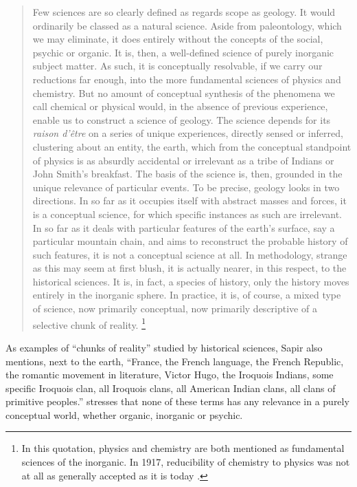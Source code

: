 \documentclass[output=paper]{langscibook}
\begin{document}
\begin{quotation}
    Few sciences are so clearly defined as regards scope as geology. It would ordinarily be classed as a natural science. Aside from paleontology, which we may eliminate, it does entirely without the concepts of the social, psychic or organic. It is, then, a well-defined science of purely inorganic subject matter. As such, it is conceptually resolvable, if we carry our reductions far enough, into the more fundamental sciences of physics and chemistry. But no amount of conceptual synthesis of the phenomena we call chemical or physical would, in the absence of previous experience, enable us to construct a science of geology. The science depends for its \emph{raison d'être} on a series of unique experiences, directly sensed or inferred, clustering about an entity, the earth, which from the conceptual standpoint of physics is as absurdly accidental or irrelevant as a tribe of Indians or John Smith's breakfast. The basis of the science is, then, grounded in the unique relevance of particular events. To be precise, geology looks in two directions. In so far as it occupies itself with abstract masses and forces, it is a conceptual science, for which specific instances as such are irrelevant. In so far as it deals with particular features of the earth's surface, say a particular mountain chain, and aims to reconstruct the probable history of such features, it is not a conceptual science at all. In methodology, strange as this may seem at first blush, it is actually nearer, in this respect, to the historical sciences. It is, in fact, a species of history, only the history moves entirely in the inorganic sphere. In practice, it is, of course, a mixed type of science, now primarily conceptual, now primarily descriptive of a selective chunk of reality.\label{q:elffers:sapirquote}
    \citep[445]{Sapir1917}\footnote{In this quotation, physics and chemistry are both mentioned as fundamental sciences of the inorganic. In 1917, reducibility of chemistry to physics was not at all as generally accepted as it is today \citep[cf.][13, 17--18]{Hettema2012}.} 
\end{quotation}

As examples of ``chunks of reality'' studied by historical sciences, Sapir also mentions, next to the earth, ``France, the French language, the French Republic, the romantic movement in literature, Victor Hugo, the Iroquois Indians, some specific Iroquois clan, all Iroquois clans, all American Indian clans, all clans of primitive peoples.'' \citet[446]{Sapir1917} stresses that none of these terms has any relevance in a purely conceptual world, whether organic, inorganic or psychic.
\end{document}
